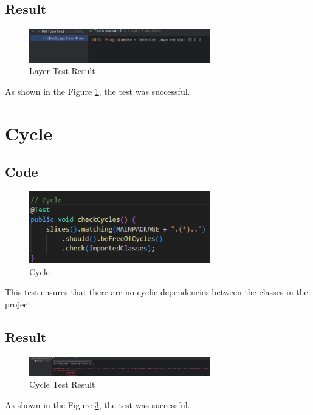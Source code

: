 \documentclass[a4paper,11pt,openright,BCOR=15mm]{scrbook}
\begin{document}
	\subsection{Result}
	\begin{figure}[H]
		\centering
		\includegraphics[width=0.7\textwidth]{figs/Architectural Compliance/Layer.png}
		\caption{Layer Test Result}
		\label{fig:Layer}
	\end{figure}
	As shown in the Figure \ref{fig:Layer}, the test was successful.




	\section{Cycle}
	\subsection{Code}
	\begin{figure}[H]
		\centering
		\includegraphics[width=0.7\textwidth]{figs/Architectural Compliance/Cycle Code.png}
		\caption{Cycle}
		\label{fig:Cycle-Code}
	\end{figure}
	This test ensures that there are no cyclic dependencies between the classes in the project.
	\subsection{Result}
	\begin{figure}[H]
		\centering
		\includegraphics[width=0.7\textwidth]{figs/Architectural Compliance/Cycle.png}
		\caption{Cycle Test Result}
		\label{fig:Cycle}
	\end{figure}
	As shown in the Figure \ref{fig:Cycle}, the test was successful.
\end{document}
